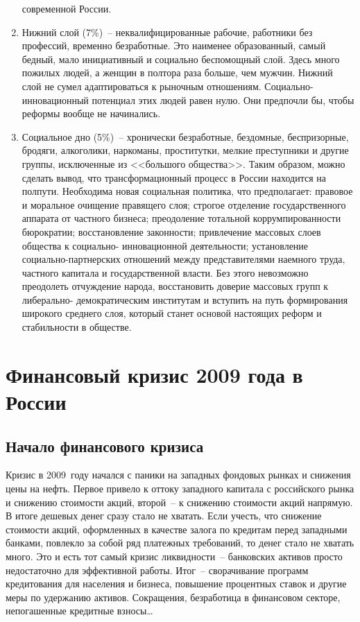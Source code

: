 \begin{enumerate}
      современной России.
    \item Нижний слой (7\%)~-- неквалифицированные рабочие, работники без
      профессий, временно безработные. Это наименее образованный, самый бедный,
      мало инициативный и социально беспомощный слой. Здесь много пожилых
      людей, а женщин в полтора раза больше, чем мужчин. Нижний слой не сумел
      адаптироваться к рыночным отношениям. Социально- инновационный потенциал
      этих людей равен нулю. Они предпочли бы, чтобы реформы вообще не
      начинались.
    \item Социальное дно (5\%)~-- хронически безработные, бездомные,
      беспризорные, бродяги, алкоголики, наркоманы, проститутки, мелкие
      преступники и другие группы, исключенные из <<большого общества>>. Таким
      образом, можно сделать вывод, что трансформационный процесс в России
      находится на полпути. Необходима новая социальная политика, что
      предполагает: правовое и моральное очищение правящего слоя; строгое
      отделение государственного аппарата от частного бизнеса; преодоление
      тотальной коррумпированности бюрократии; восстановление законности;
      привлечение массовых слоев общества к социально- инновационной
      деятельности; установление социально-партнерских отношений между
      представителями наемного труда, частного капитала и государственной
      власти. Без этого невозможно преодолеть отчуждение народа, восстановить
      доверие массовых групп к либерально- демократическим институтам и
      вступить на путь формирования широкого среднего слоя, который станет
      основой настоящих реформ и стабильности в обществе.~\cite{tipov}
    \end{enumerate}

  \section{Финансовый кризис 2009 года в России}

  \subsection{Начало финансового кризиса}

  Кризис в 2009~году начался с паники на западных фондовых рынках и снижения
  цены на нефть. Первое привело к оттоку западного капитала с российского рынка
  и снижению стоимости акций, второй~-- к снижению стоимости акций напрямую. В
  итоге дешевых денег сразу стало не хватать. Если учесть, что снижение
  стоимости акций, оформленных в качестве залога по кредитам перед западными
  банками, повлекло за собой ряд платежных требований, то денег стало не
  хватать много. Это и есть тот самый кризис ликвидности~-- банковских активов
  просто недостаточно для эффективной работы. Итог~-- сворачивание программ
  кредитования для населения и бизнеса, повышение процентных ставок и другие
  меры по удержанию активов. Сокращения, безработица в финансовом секторе,
  непогашенные кредитные взносы\ldots

